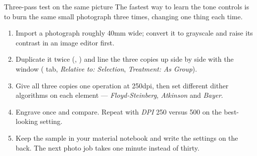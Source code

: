 \begin{tryit}{Three-pass test on the same picture}
The fastest way to learn the tone controls is to burn the same small photograph
three times, changing one thing each time.
\begin{enumerate}[label=\arabic*.,leftmargin=1.4em]
  \item Import a photograph roughly 40\unit{mm} wide; convert it to grayscale and
        raise its contrast in an image editor first.
  \item Duplicate it twice (, ) and line the
        three copies up side by side with the  window
        ( tab, \emph{Relative to: Selection}, \emph{Treatment: As
        Group}).
  \item Give all three copies one  operation at 250\unit{dpi},
        then set different dither algorithms on each element ---
        \emph{Floyd-Steinberg}, \emph{Atkinson} and \emph{Bayer}.
  \item Engrave once and compare. Repeat with \emph{DPI} 250 versus 500 on the
        best-looking setting.
  \item Keep the sample in your material notebook and write the settings on the
        back. The next photo job takes one minute instead of thirty.
\end{enumerate}
\end{tryit}
